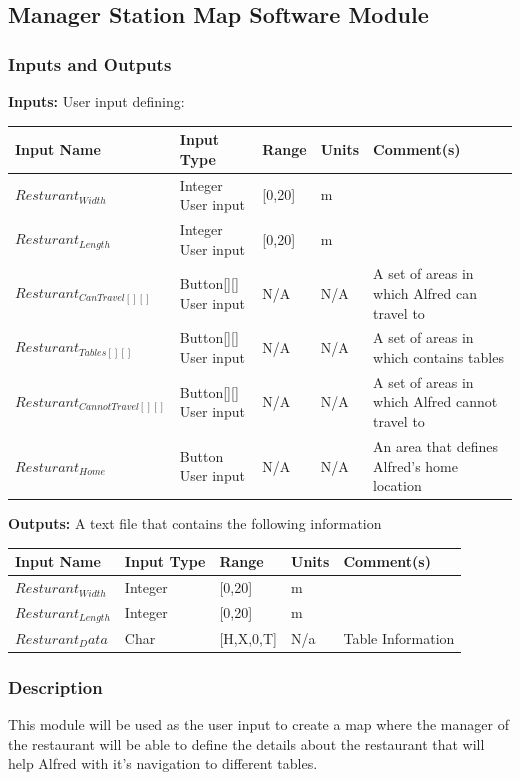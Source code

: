 \documentclass [10pt]{article}
\begin{document}
\subsection{Manager Station Map Software Module}

\subsubsection{Inputs and Outputs}

\textbf{Inputs: } User input defining:

\begin{longtable}{|l|l|l|l|l|}\hline 
	\rowcolor{tableCell}Input Name & Input Type & Range & Units & Comment(s) \\ \hline
	$ Resturant_{Width} $ & Integer User input &  [0,20] & m &  \\ \hline
	$ Resturant_{Length} $ & Integer User input &  [0,20] & m &  \\ \hline
	$ Resturant_{CanTravel[][]} $ & Button[][] User input &  N/A & N/A & A set of areas in which Alfred can travel to \\ \hline
	$ Resturant_{Tables[][]} $ & Button[][] User input &  N/A & N/A & A set of areas in which contains tables \\ \hline
	$ Resturant_{CannotTravel[][]} $ & Button[][] User input &  N/A & N/A & A set of areas in which Alfred cannot travel to \\ \hline
	$ Resturant_{Home} $ & Button User input &  N/A & N/A & An area that defines Alfred's home location \\ \hline
\end{longtable}


\textbf{Outputs: }A text file that contains the following information
\begin{longtable}{|l|l|l|l|l|}\hline 
	\rowcolor{tableCell}Input Name & Input Type & Range & Units & Comment(s) \\ \hline
	$ Resturant_{Width} $ & Integer &  [0,20] & m &  \\ \hline
	$ Resturant_{Length} $ & Integer  &  [0,20] & m &  \\ \hline
	$ Resturant_Data $& Char  &  [H,X,0,T] & N/a & Table Information \\ \hline
\end{longtable}


\subsubsection{Description}
This module will be used as the user input to create a map where the manager of the restaurant will be able to define the details about the restaurant that will help Alfred with it's navigation to different tables.
\end{document}
